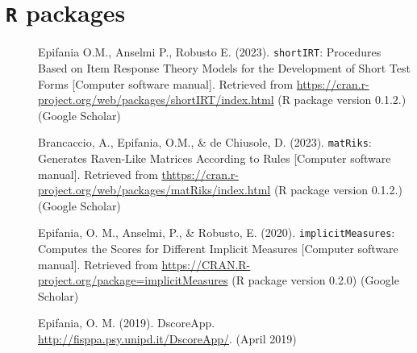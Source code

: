 \documentclass[letterpaper,12pt]{article}
\begin{document}
\section{\texttt{R} packages}
\begin{description}
	\item[] Epifania O.M., Anselmi P., Robusto E. (2023). \texttt{shortIRT}: Procedures Based on Item Response Theory Models for the
	Development of Short Test Forms [Computer software manual]. Retrieved from \href{https://cran.r-project.org/web/packages/shortIRT/index.html}{https://cran.r-project.org/web/packages/shortIRT/index.html} (R package version 0.1.2.) (Google Scholar)
	
	\item[] Brancaccio, A., Epifania, O.M., \& de Chiusole, D. (2023). \texttt{matRiks}: Generates Raven-Like Matrices According to Rules [Computer software manual]. Retrieved from \href{https://cran.r-project.org/web/packages/matRiks/index.html}{thttps://cran.r-project.org/web/packages/matRiks/index.html} (R package version 0.1.2.) (Google Scholar)
	
	\item[] Epifania, O. M., Anselmi, P., \& Robusto, E. (2020). \texttt{implicitMeasures}: Computes the Scores for Different Implicit Measures [Computer software manual]. Retrieved from
	\href{https://CRAN.R-project.org/package=implicitMeasures}{https://CRAN.R-project.org/package=implicitMeasures} (R package version 0.2.0) (Google Scholar)
	
	
	\item[] Epifania, O. M. (2019). DscoreApp. \href{http://fisppa.psy.unipd.it/DscoreApp/}{http://fisppa.psy.unipd.it/DscoreApp/}.  (April 2019)
\end{description}
\end{document}
